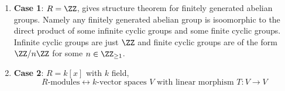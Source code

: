 \begin{eg}
	\leavevmode
	\begin{enumerate}
		\item \textbf{Case 1}: \( R = \ZZ \), gives structure theorem for finitely generated abelian
		      groups. Namely any finitely generated abelian group is isoomorphic to the direct product
		      of some infinite cyclic groups and some finite cyclic groups. Infinite cyclic groups are
		      just \( \ZZ \) and finite cyclic groups are of the form \( \ZZ/n\ZZ \) for some \( n \in
		      \ZZ_{\geq 1} \).
		\item \textbf{Case 2}: \( R = k[x] \) with \( k \) field, 
		      \[
			      R\text{-modules} \longleftrightarrow k\text{-vector spaces }V \text{ with linear morphism } T: V
			      \to V
		      \]
	\end{enumerate}
\end{eg}
